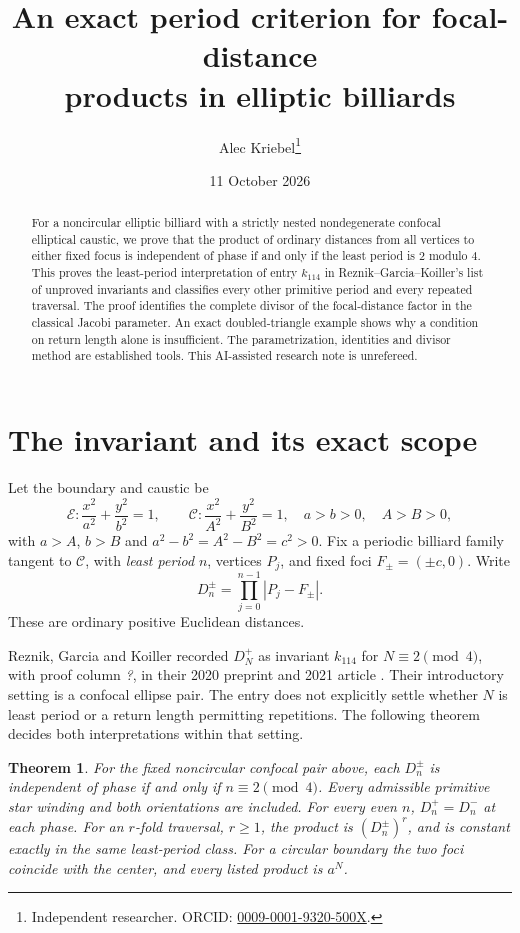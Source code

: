 \documentclass[11pt]{article}
\title{An exact period criterion for focal-distance\\products in elliptic billiards}
\author{Alec Kriebel\thanks{Independent researcher.
ORCID: \href{https://orcid.org/0009-0001-9320-500X}{0009-0001-9320-500X}.}}
\date{11 October 2026}
\newtheorem{theorem}{Theorem}
\begin{document}
\maketitle
\begin{abstract}
For a noncircular elliptic billiard with a strictly nested nondegenerate
confocal elliptical caustic, we prove that the product of ordinary distances
from all vertices to either fixed focus is independent of phase if and only
if the least period is \(2\) modulo \(4\).
This proves the least-period interpretation of entry \(k_{114}\) in
Reznik--Garcia--Koiller's list of unproved invariants and classifies every
other primitive period and every repeated traversal.
The proof identifies the complete divisor of the focal-distance factor
in the classical Jacobi parameter. An exact doubled-triangle example
shows why a condition on return length alone is insufficient.
The parametrization, identities and divisor method are established tools.
This AI-assisted research note is unrefereed.
\end{abstract}

\section{The invariant and its exact scope}
Let the boundary and caustic be
\[
 \mathcal E:\frac{x^2}{a^2}+\frac{y^2}{b^2}=1,\qquad
 \mathcal C:\frac{x^2}{A^2}+\frac{y^2}{B^2}=1,
 \quad a>b>0,\quad A>B>0,
\]
with \(a>A\), \(b>B\) and \(a^2-b^2=A^2-B^2=c^2>0\).
Fix a periodic billiard family tangent to \(\mathcal C\), with
\emph{least period} \(n\), vertices \(P_j\), and fixed foci
\(F_\pm=(\pm c,0)\). Write
\[
 D_n^\pm=\prod_{j=0}^{n-1}|P_j-F_\pm|.
\]
These are ordinary positive Euclidean distances.

Reznik, Garcia and Koiller recorded \(D_N^+\) as invariant \(k_{114}\)
for \(N\equiv2\pmod4\), with proof column \emph{?}, in their 2020
preprint and 2021 article \cite[Table~2, p.~345]{source}.
Their introductory setting is a confocal ellipse pair.
The entry does not explicitly settle whether \(N\) is least period or
a return length permitting repetitions. The following theorem decides
both interpretations within that setting.

\begin{theorem}\label{thm:criterion}
For the fixed noncircular confocal pair above, each \(D_n^\pm\) is
independent of phase if and only if \(n\equiv2\pmod4\).
Every admissible primitive star winding and both orientations are included.
For every even \(n\), \(D_n^+=D_n^-\) at each phase.
For an \(r\)-fold traversal, \(r\ge1\), the product is
\((D_n^\pm)^r\), and is constant exactly in the same least-period class.
For a circular boundary the two foci coincide with the center, and
every listed product is \(a^N\).
\end{theorem}
\end{document}
